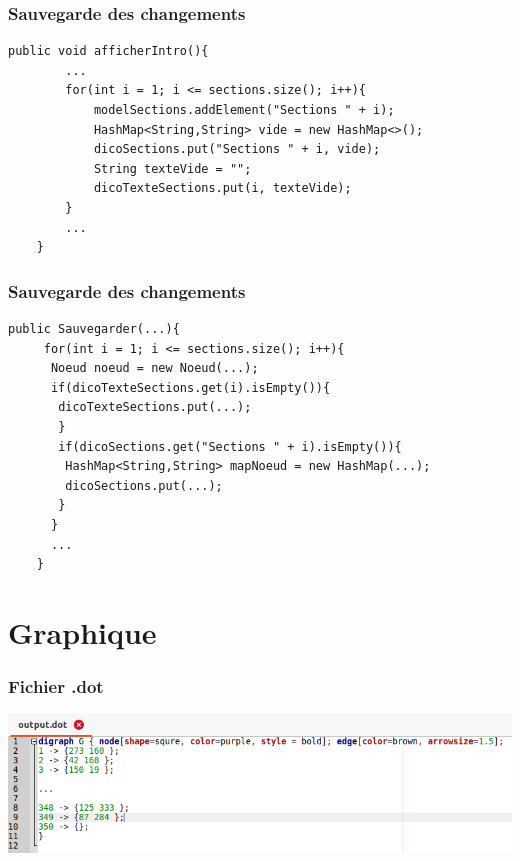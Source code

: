 \documentclass{beamer}
\begin{document}
\begin{frame}[containsverbatim]
\frametitle{Sauvegarde des changements}
\begin{lstlisting}[tabsize=3,gobble=3]
	public void afficherIntro(){
		...
		for(int i = 1; i <= sections.size(); i++){
			modelSections.addElement("Sections " + i);
			HashMap<String,String> vide = new HashMap<>();
			dicoSections.put("Sections " + i, vide);
			String texteVide = "";
			dicoTexteSections.put(i, texteVide);
		}
		...
	}
\end{lstlisting}
\end{frame}

\begin{frame}[containsverbatim]
\frametitle{Sauvegarde des changements}
\begin{lstlisting}[tabsize=3,gobble=3]
   public Sauvegarder(...){
	 for(int i = 1; i <= sections.size(); i++){
      Noeud noeud = new Noeud(...);
      if(dicoTexteSections.get(i).isEmpty()){
       dicoTexteSections.put(...);
       }
       if(dicoSections.get("Sections " + i).isEmpty()){
        HashMap<String,String> mapNoeud = new HashMap(...);
        dicoSections.put(...);
       }
      }
	  ...
	}
\end{lstlisting}
\end{frame}


\section{Graphique}
\begin{frame}
\frametitle{Fichier .dot}

\begin{center}
\includegraphics[scale=0.4]{./images/dot.png}
\end{center}

\end{frame}
\end{document}
